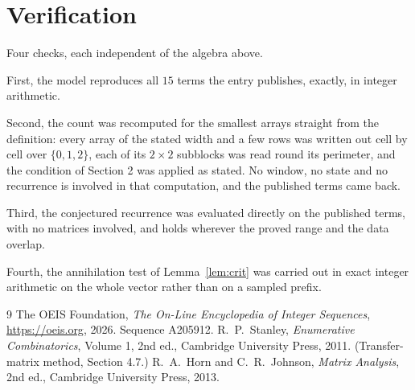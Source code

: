 \documentclass[11pt,a4paper]{article}
\theoremstyle{plain}
\theoremstyle{definition}
\begin{document}
\section{Verification}

Four checks, each independent of the algebra above.

First, the model reproduces all $15$ terms the entry publishes, exactly, in integer
arithmetic.

Second, the count was recomputed for the smallest arrays straight from the definition: every
array of the stated width and a few rows was written out cell by cell over $\{0,1,2\}$, each of
its $2\times2$ subblocks was read round its perimeter, and the condition of Section 2 was
applied as stated. No window, no state and no recurrence is involved in that computation, and
the published terms came back.

Third, the conjectured recurrence was evaluated directly on the published terms, with no
matrices involved, and holds wherever the proved range and the data overlap.

Fourth, the annihilation test of Lemma~\ref{lem:crit} was carried out in exact integer
arithmetic on the whole vector rather than on a sampled prefix.

\begin{thebibliography}{9}
 The OEIS Foundation, \emph{The On-Line Encyclopedia of Integer
Sequences}, \url{https://oeis.org}, 2026. Sequence A205912.
 R.~P.~Stanley, \emph{Enumerative Combinatorics}, Volume 1, 2nd ed.,
Cambridge University Press, 2011. (Transfer-matrix method, Section 4.7.)
 R.~A.~Horn and C.~R.~Johnson, \emph{Matrix Analysis}, 2nd ed., Cambridge
University Press, 2013.
\end{thebibliography}
\end{document}
